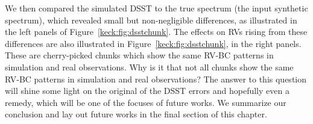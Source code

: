 We then compared the simulated DSST to the true spectrum (the input
synthetic spectrum), which revealed small but non-negligible
differences, as illustrated in the left panels of
Figure~\ref{keck:fig:dsstchunk}. The effects on RVs rising from these
differences are also illustrated in Figure~\ref{keck:fig:dsstchunk},
in the right panels. These are cherry-picked chunks which show the
same RV-BC patterns in simulation and real observations. Why is it
that not all chunks show the same RV-BC patterns in simulation and real
observations? The answer to this question will shine some light on the
original of the DSST errors and hopefully even a remedy, which will be
one of the focuses of future works. We summarize our conclusion and
lay out future works in the final section of this chapter.


